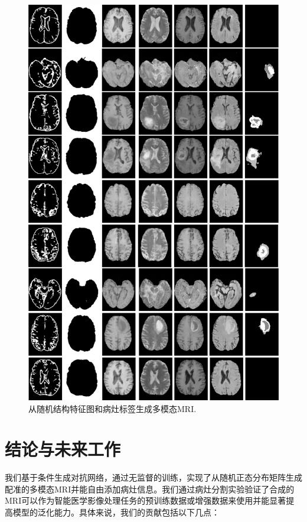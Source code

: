\documentclass[letterpaper]{article} %
\begin{document}
\begin{figure}
	\centering
	\includegraphics[width=0.98\linewidth]{figures/F_to_MRI}
	\caption{从随机结构特征图和病灶标签生成多模态MRI.}
	\label{generated_mri}
\end{figure}

\section{结论与未来工作}

我们基于条件生成对抗网络，通过无监督的训练，实现了从随机正态分布矩阵生成配准的多模态MRI并能自由添加病灶信息。我们通过病灶分割实验验证了合成的MRI可以作为智能医学影像处理任务的预训练数据或增强数据来使用并能显著提高模型的泛化能力。具体来说，我们的贡献包括以下几点：
\end{document}
